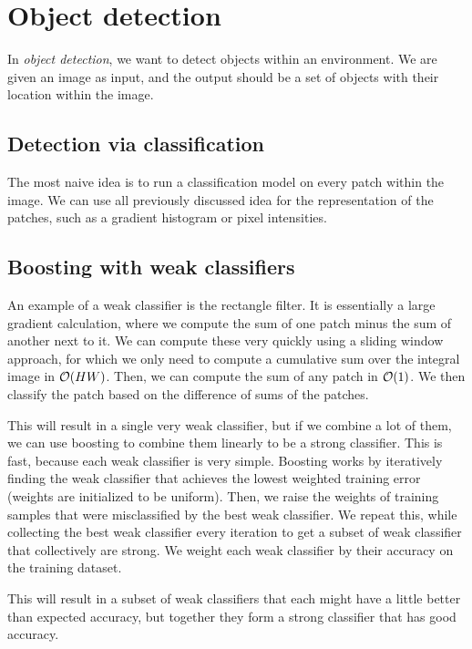\section{Object detection}

In \textit{object detection}, we want to detect objects within an environment.
We are given an image as input, and the output should be a set of objects with
their location within the image.

\subsection{Detection via classification}

The most naive idea is to run a classification model on every patch within the
image. We can use all previously discussed idea for the representation of the
patches, such as a gradient histogram or pixel intensities.

\subsection{Boosting with weak classifiers}

An example of a weak classifier is the rectangle filter. It is essentially a
large gradient calculation, where we compute the sum of one patch minus the sum
of another next to it. We can compute these very quickly using a sliding window
approach, for which we only need to compute a cumulative sum over the integral
image in $\bigo{HW}$. Then, we can compute the sum of any patch in
$\bigo{1}$. We then classify the patch based on the difference of sums of the
patches.

This will result in a single very weak classifier, but if we combine a lot of
them, we can use boosting to combine them linearly to be a strong classifier.
This is fast, because each weak classifier is very simple. Boosting works by
iteratively finding the weak classifier that achieves the lowest weighted
training error (weights are initialized to be uniform). Then, we raise the
weights of training samples that were misclassified by the best weak
classifier. We repeat this, while collecting the best weak classifier every
iteration to get a subset of weak classifier that collectively are strong. We
weight each weak classifier by their accuracy on the training dataset.

This will result in a subset of weak classifiers that each might have a little
better than expected accuracy, but together they form a strong classifier that
has good accuracy.

